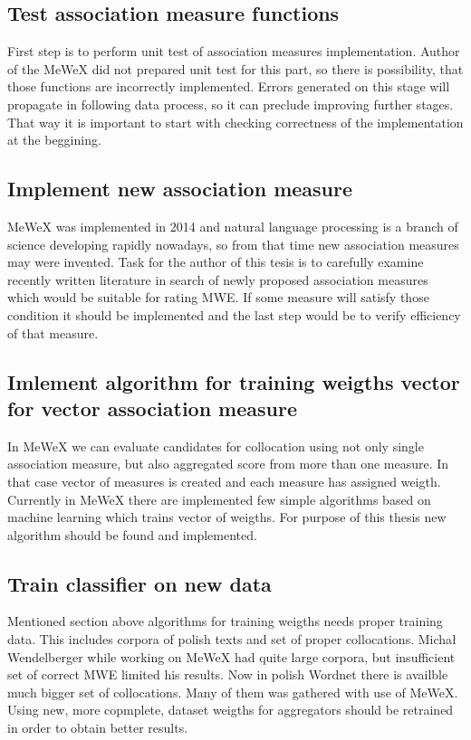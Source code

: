 \subsection{Test association measure functions}
First step is to perform unit test of association measures implementation. Author of the MeWeX did not prepared unit test for this part, 
so there is possibility, that those functions are incorrectly implemented. Errors generated on this stage will propagate in following data process, 
so it can preclude improving further stages. That way it is important to start with checking correctness of the implementation 
at the beggining.

\subsection{Implement new association measure}
MeWeX was implemented in 2014 and natural language processing is a branch of science developing rapidly nowadays, 
so from that time new association measures may were invented. Task for the author of this tesis is to carefully examine recently written literature 
in search of newly proposed association measures which would be suitable for rating MWE. If some measure will satisfy those condition it should 
be implemented and the last step would be to verify efficiency of that measure.

\subsection{Imlement algorithm for training weigths vector for vector association measure}
In MeWeX we can evaluate candidates for collocation using not only single association measure, but also aggregated score from more than one measure. 
In that case vector of measures is created and each measure has assigned weigth. Currently in MeWeX there are implemented few simple algorithms 
based on machine learning which trains vector of weigths. For purpose of this thesis new algorithm should be found and implemented.

\subsection{Train classifier on new data}
Mentioned section above algorithms for training weigths needs proper training data. This includes corpora of polish texts and set 
of proper collocations. Michał Wendelberger while working on MeWeX had quite large corpora, but insufficient set of correct MWE limited his results. 
Now in polish Wordnet there is availble much bigger set of collocations. Many of them was gathered with use of MeWeX.
Using new, more copmplete, dataset weigths for aggregators should be retrained in order to obtain better results.

